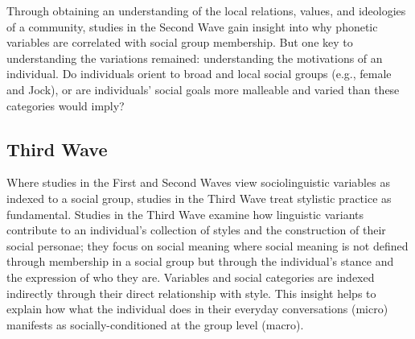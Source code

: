 
Through obtaining an understanding of the local relations, values, and ideologies of a community, studies in the Second Wave gain insight into why phonetic variables are correlated with social group membership.  But one key to understanding the variations remained: understanding the motivations of an individual.  Do individuals orient to broad and local social groups (e.g., female and Jock), or are individuals' social goals more malleable and varied than these categories would imply?  


\subsection{Third Wave}\label{sec:thirdwave}

Where studies in the First and Second Waves view sociolinguistic variables as indexed to a social group, studies in the Third Wave treat stylistic practice as fundamental.  Studies in the Third Wave examine how linguistic variants contribute to an individual's collection of styles and the construction of their social personae; they focus on social meaning where social meaning is not defined through membership in a social group but through the individual's stance and the expression of who they are.  Variables and social categories are indexed indirectly through their direct relationship with style.  This insight helps to explain how what the individual does in their everyday conversations (micro) manifests as socially-conditioned at the group level (macro).

